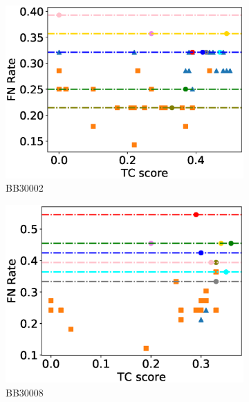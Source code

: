 \begin{figure}[!htbp]
	
	\begin{adjustwidth}{-1cm}{-1cm}
		\centering
		\begin{subfigure}{0.22\textwidth}
			\includegraphics[width=\columnwidth]{Figure/summary/precomputedInit/Balibase/BB30002_fnrate_vs_tc_2}
			\caption{BB30002}
		\end{subfigure}	
		\begin{subfigure}{0.22\textwidth}
			\includegraphics[width=\columnwidth]{Figure/summary/precomputedInit/Balibase/BB30008_fnrate_vs_tc_2}
			\caption{BB30008}
		\end{subfigure}
		\begin{subfigure}{0.22\textwidth}

\end{subfigure}
\end{adjustwidth}
\end{figure}
